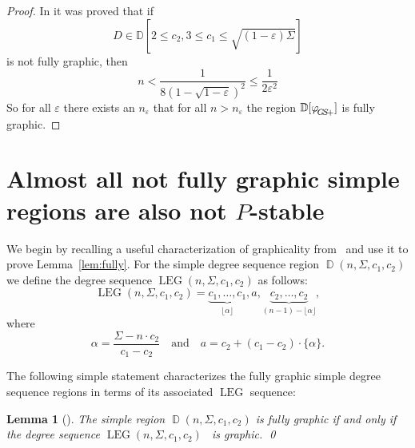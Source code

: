 \documentclass[11pt]{elsarticle}
\theoremstyle{plain}
\newtheorem{lemma}[theorem]{Lemma}
\theoremstyle{definition}
\def\mD{\mathbb{D}}
\def\ds{\rule{0pt}{1.5ex}}
\newcommand{\fal}{\lfloor \alpha \rfloor}
\newcommand{\dds}[4]{\operatorname{\mathbb D}(#1,#2,#3,#4)}
\newcommand{\lb}{\operatorname{LEG}}
\begin{document}
\begin{proof}
In \cite[Theorem 3.4]{fully} it was proved that if
\[
D\in\mD[2\leq c_2, 3\leq c_1\leq \sqrt{(1-\varepsilon)\Sigma}]
\]
is not fully graphic, then
\begin{equation}\label{eq:main-gs2}
n<  \frac{1}{8(1-\sqrt{1-\varepsilon})^2} \leq \frac{1}{2 \varepsilon^2}
\end{equation}
So for all $\varepsilon$ there exists an $n_\varepsilon$ that for all $n> n_\varepsilon$ the region $\mD[{\varphi}_{\ds \! {G\!S\!+}}]$ is fully graphic.

\end{proof}


\section{Almost all not fully graphic simple regions are also not $P$-stable}\label{sec:almost}

We begin by recalling a useful characterization of graphicality from~\cite{fully} and use it to prove Lemma~\ref{lem:fully}.
For the simple degree sequence region $\dds{n}{\Sigma}{c_1}{c_2}$  we define  the degree sequence $\lb(n,\Sigma,c_1,c_2)$ as follows:
\begin{equation}\label{eq:LEG}
\lb(n,\Sigma,c_1,c_2)= \underbrace{c_1,\ldots,c_1}_{\fal}, a, \underbrace{c_2, \ldots, c_2}_{(n-1)-\fal},
\end{equation}
where
\begin{equation}\label{eq:alpha}
\alpha= \frac{\Sigma - n\cdot c_2}{c_1-c_2}
\quad\text{and}\quad
a = c_2 + (c_1-c_2)\cdot \{\alpha\}.
\end{equation}


\noindent The following simple statement characterizes the fully graphic simple degree sequence regions in terms of its associated $\lb$ sequence:
\begin{lemma}[{\cite[Theorem 2.5]{fully}}]\label{lem:LEG}
The simple region $\dds{n}{\Sigma}{c_1}{c_2}$ is fully graphic if and only if the degree sequence $\lb(n,\Sigma,c_1,c_2)$ \ is graphic. \qed
\end{lemma}
\end{document}
